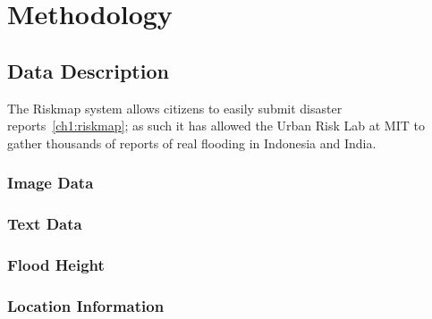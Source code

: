 \chapter{Methodology}
\section{Data Description}
The Riskmap system allows citizens to easily submit 
disaster reports~\ref{ch1:riskmap}; as such it has allowed the Urban Risk Lab at
MIT to gather thousands of reports of real flooding in Indonesia and India.

\subsection{Image Data}

\subsection{Text Data}
\subsection{Flood Height}
\subsection{Location Information}

\section{}
